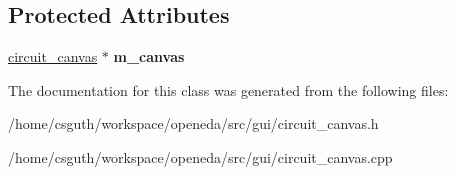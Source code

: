 \subsection*{Protected Attributes}
\begin{DoxyCompactItemize}
\item 
\hypertarget{classophidian_1_1gui_1_1canvas__states_1_1state_adaea148b227fd036133e979aeeed1f36}{\hyperlink{classophidian_1_1gui_1_1circuit__canvas}{circuit\-\_\-canvas} $\ast$ {\bfseries m\-\_\-canvas}}\label{classophidian_1_1gui_1_1canvas__states_1_1state_adaea148b227fd036133e979aeeed1f36}

\end{DoxyCompactItemize}


The documentation for this class was generated from the following files\-:\begin{DoxyCompactItemize}
\item 
/home/csguth/workspace/openeda/src/gui/circuit\-\_\-canvas.\-h\item 
/home/csguth/workspace/openeda/src/gui/circuit\-\_\-canvas.\-cpp\end{DoxyCompactItemize}
